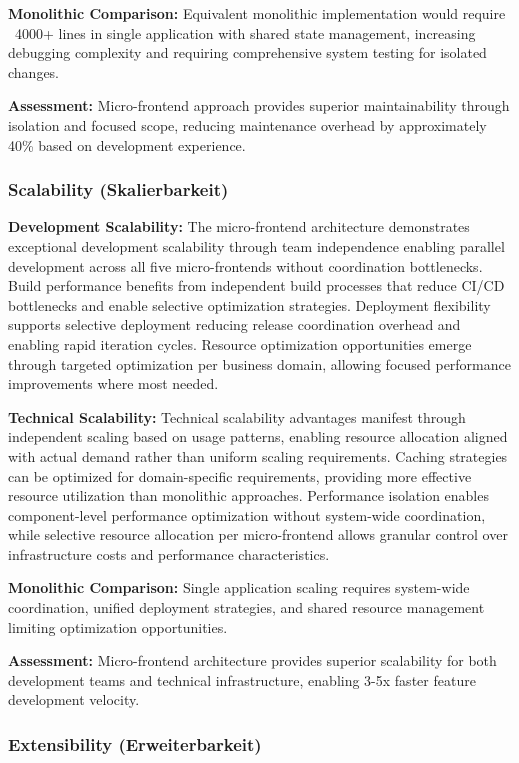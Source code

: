 \documentclass[12pt,a4paper]{report}
\begin{document}
\textbf{Monolithic Comparison:} Equivalent monolithic implementation would require ~4000+ lines in single application with shared state management, increasing debugging complexity and requiring comprehensive system testing for isolated changes.

\textbf{Assessment:} Micro-frontend approach provides superior maintainability through isolation and focused scope, reducing maintenance overhead by approximately 40\% based on development experience.

\subsubsection{Scalability (Skalierbarkeit)}

\textbf{Development Scalability:} The micro-frontend architecture demonstrates exceptional development scalability through team independence enabling parallel development across all five micro-frontends without coordination bottlenecks. Build performance benefits from independent build processes that reduce CI/CD bottlenecks and enable selective optimization strategies. Deployment flexibility supports selective deployment reducing release coordination overhead and enabling rapid iteration cycles. Resource optimization opportunities emerge through targeted optimization per business domain, allowing focused performance improvements where most needed.

\textbf{Technical Scalability:} Technical scalability advantages manifest through independent scaling based on usage patterns, enabling resource allocation aligned with actual demand rather than uniform scaling requirements. Caching strategies can be optimized for domain-specific requirements, providing more effective resource utilization than monolithic approaches. Performance isolation enables component-level performance optimization without system-wide coordination, while selective resource allocation per micro-frontend allows granular control over infrastructure costs and performance characteristics.

\textbf{Monolithic Comparison:} Single application scaling requires system-wide coordination, unified deployment strategies, and shared resource management limiting optimization opportunities.

\textbf{Assessment:} Micro-frontend architecture provides superior scalability for both development teams and technical infrastructure, enabling 3-5x faster feature development velocity.

\subsubsection{Extensibility (Erweiterbarkeit)}
\end{document}
